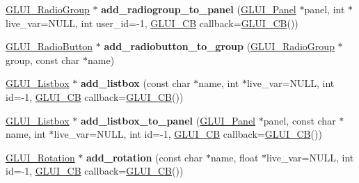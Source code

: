 \begin{DoxyCompactItemize}
\item 
\hypertarget{class_g_l_u_i_a04c4b7d1f3c2721394fe4fea5d8a6c74}{\hyperlink{class_g_l_u_i___radio_group}{G\+L\+U\+I\+\_\+\+Radio\+Group} $\ast$ {\bfseries add\+\_\+radiogroup\+\_\+to\+\_\+panel} (\hyperlink{class_g_l_u_i___panel}{G\+L\+U\+I\+\_\+\+Panel} $\ast$panel, int $\ast$live\+\_\+var=N\+U\+L\+L, int user\+\_\+id=-\/1, \hyperlink{class_g_l_u_i___c_b}{G\+L\+U\+I\+\_\+\+C\+B} callback=\hyperlink{class_g_l_u_i___c_b}{G\+L\+U\+I\+\_\+\+C\+B}())}\label{class_g_l_u_i_a04c4b7d1f3c2721394fe4fea5d8a6c74}

\item 
\hypertarget{class_g_l_u_i_ab51b55ac34959b9ebbf96d0275762d61}{\hyperlink{class_g_l_u_i___radio_button}{G\+L\+U\+I\+\_\+\+Radio\+Button} $\ast$ {\bfseries add\+\_\+radiobutton\+\_\+to\+\_\+group} (\hyperlink{class_g_l_u_i___radio_group}{G\+L\+U\+I\+\_\+\+Radio\+Group} $\ast$group, const char $\ast$name)}\label{class_g_l_u_i_ab51b55ac34959b9ebbf96d0275762d61}

\item 
\hypertarget{class_g_l_u_i_af53d02f127222cda08ffb816f82825f0}{\hyperlink{class_g_l_u_i___listbox}{G\+L\+U\+I\+\_\+\+Listbox} $\ast$ {\bfseries add\+\_\+listbox} (const char $\ast$name, int $\ast$live\+\_\+var=N\+U\+L\+L, int id=-\/1, \hyperlink{class_g_l_u_i___c_b}{G\+L\+U\+I\+\_\+\+C\+B} callback=\hyperlink{class_g_l_u_i___c_b}{G\+L\+U\+I\+\_\+\+C\+B}())}\label{class_g_l_u_i_af53d02f127222cda08ffb816f82825f0}

\item 
\hypertarget{class_g_l_u_i_a46841a8ac40bb010858366b3d8ba4e86}{\hyperlink{class_g_l_u_i___listbox}{G\+L\+U\+I\+\_\+\+Listbox} $\ast$ {\bfseries add\+\_\+listbox\+\_\+to\+\_\+panel} (\hyperlink{class_g_l_u_i___panel}{G\+L\+U\+I\+\_\+\+Panel} $\ast$panel, const char $\ast$name, int $\ast$live\+\_\+var=N\+U\+L\+L, int id=-\/1, \hyperlink{class_g_l_u_i___c_b}{G\+L\+U\+I\+\_\+\+C\+B} callback=\hyperlink{class_g_l_u_i___c_b}{G\+L\+U\+I\+\_\+\+C\+B}())}\label{class_g_l_u_i_a46841a8ac40bb010858366b3d8ba4e86}

\item 
\hypertarget{class_g_l_u_i_a655410f5989334cd550e2c1612c324a7}{\hyperlink{class_g_l_u_i___rotation}{G\+L\+U\+I\+\_\+\+Rotation} $\ast$ {\bfseries add\+\_\+rotation} (const char $\ast$name, float $\ast$live\+\_\+var=N\+U\+L\+L, int id=-\/1, \hyperlink{class_g_l_u_i___c_b}{G\+L\+U\+I\+\_\+\+C\+B} callback=\hyperlink{class_g_l_u_i___c_b}{G\+L\+U\+I\+\_\+\+C\+B}())}\label{class_g_l_u_i_a655410f5989334cd550e2c1612c324a7}


\end{DoxyCompactItemize}
